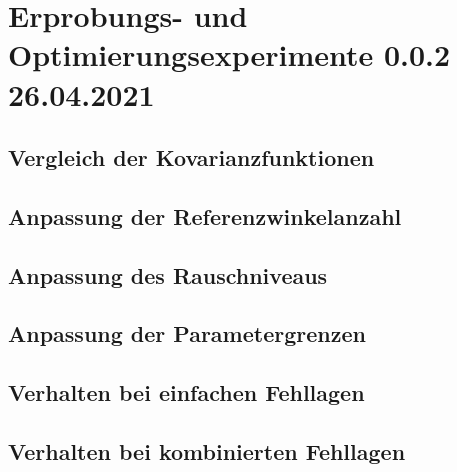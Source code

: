 %

\chapter{Erprobungs- und Optimierungsexperimente 0.0.2 26.04.2021}\label{ch:erprobungs-u-opt-exp}
	
	
\section{Vergleich der Kovarianzfunktionen}\label{sec:exp1}


\section{Anpassung der Referenzwinkelanzahl}\label{sec:exp2}


\section{Anpassung des Rauschniveaus}\label{sec:exp3}


\section{Anpassung der Parametergrenzen}\label{sec:exp4}


\section{Verhalten bei einfachen Fehllagen}\label{sec:exp5}


\section{Verhalten bei kombinierten Fehllagen}\label{sec:exp6}
	

